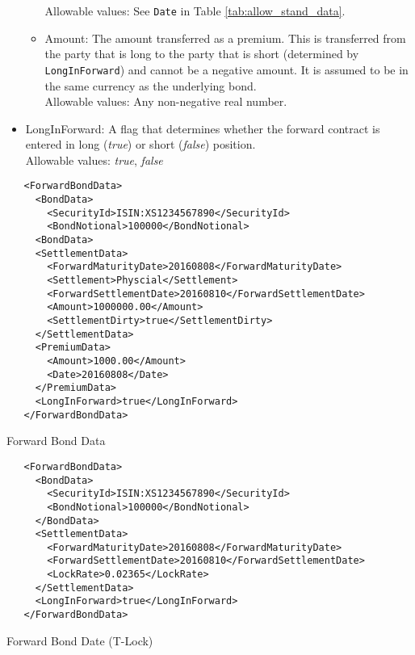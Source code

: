 \begin{itemize}
\begin{itemize}
       Allowable values: See \lstinline!Date! in Table \ref{tab:allow_stand_data}.       
       \item Amount: The amount transferred as a premium. This is transferred from the party that is long to the party
         that is short (determined by \lstinline!LongInForward!) and cannot be a negative amount. It is assumed to be in
         the same currency as the underlying bond.\\
         Allowable values: Any non-negative real number.
   \end{itemize}
   \item LongInForward: A flag that determines whether the forward contract is entered in long (\emph{true}) or short
     (\emph{false}) position. \\
       Allowable values: \emph{true}, \emph{false}     
\end{itemize}
 
\begin{listing}[H]
\begin{verbatim}
   <ForwardBondData>
     <BondData>
       <SecurityId>ISIN:XS1234567890</SecurityId>
       <BondNotional>100000</BondNotional>
     <BondData>
     <SettlementData>
       <ForwardMaturityDate>20160808</ForwardMaturityDate>
       <Settlement>Physcial</Settlement>
       <ForwardSettlementDate>20160810</ForwardSettlementDate>
       <Amount>1000000.00</Amount>
       <SettlementDirty>true</SettlementDirty>
     </SettlementData>
     <PremiumData>
       <Amount>1000.00</Amount>
       <Date>20160808</Date>
     </PremiumData>
     <LongInForward>true</LongInForward>
   </ForwardBondData>
\end{verbatim}
\caption{Forward Bond Data}
\label{lst:forward_bond_refdata}
\end{listing}

\begin{listing}[H]
   \begin{verbatim}
   <ForwardBondData>
     <BondData>
       <SecurityId>ISIN:XS1234567890</SecurityId>
       <BondNotional>100000</BondNotional>
     </BondData>
     <SettlementData>
       <ForwardMaturityDate>20160808</ForwardMaturityDate>
       <ForwardSettlementDate>20160810</ForwardSettlementDate>
       <LockRate>0.02365</LockRate>
     </SettlementData>
     <LongInForward>true</LongInForward>
   </ForwardBondData>
\end{verbatim}
\caption{Forward Bond Date (T-Lock)}
\label{lst:forward_bond_refdata_tlock}
\end{listing}

